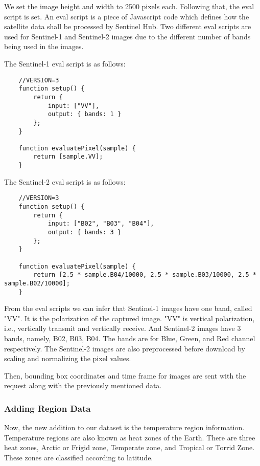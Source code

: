 We set the image height and width to 2500 pixels each. Following that, the eval script is set. An eval script is a piece of Javascript code which defines how the satellite data shall be processed by Sentinel Hub\cite{evalDoc}. Two different eval scripts are used for Sentinel-1 and Sentinel-2 images due to the different number of bands being used in the images.

The Sentinel-1 eval script is as follows:

\begin{lstlisting}
    //VERSION=3
    function setup() {
        return {
            input: ["VV"],
            output: { bands: 1 }
        };
    }

    function evaluatePixel(sample) {
        return [sample.VV];
    }
\end{lstlisting}

The Sentinel-2 eval script is as follows:

\begin{lstlisting}
    //VERSION=3
    function setup() {
        return {
            input: ["B02", "B03", "B04"],
            output: { bands: 3 }
        };
    }

    function evaluatePixel(sample) {
        return [2.5 * sample.B04/10000, 2.5 * sample.B03/10000, 2.5 * sample.B02/10000];
    }
\end{lstlisting}

From the eval scripts we can infer that Sentinel-1 images have one band, called "VV". It is the polarization of the captured image. "VV" is vertical polarization, i.e.,  vertically transmit and vertically receive. And Sentinel-2 images have 3 bands, namely, B02, B03, B04. The bands are for Blue, Green, and Red channel respectively. The Sentinel-2 images are also preprocessed before download by scaling and normalizing the pixel values. 

Then, bounding box coordinates and time frame for images are sent with the request along with the previously mentioned data.

\subsubsection{Adding Region Data}
Now, the new addition to our dataset is the temperature region information. Temperature regions are also known as heat zones of the Earth. There are three heat zones, Arctic or Frigid zone, Temperate zone, and Tropical or Torrid Zone. These zones are classified according to latitude.

